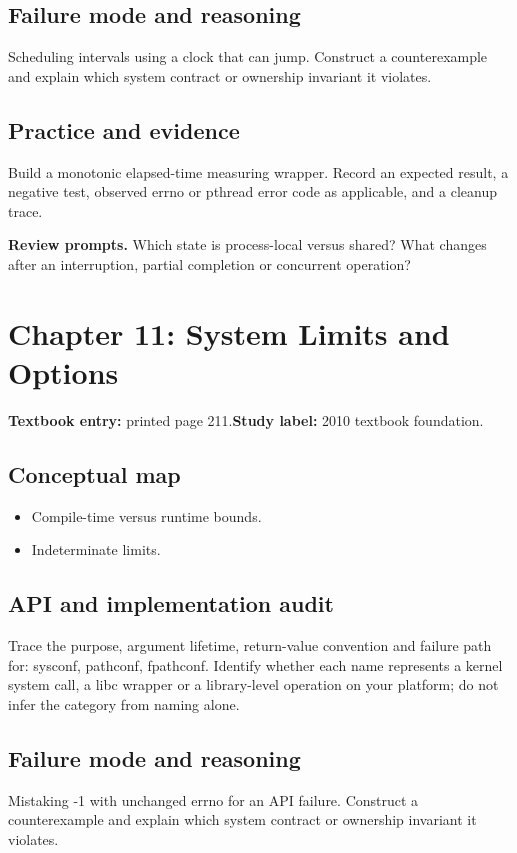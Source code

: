 \documentclass[11pt,letterpaper,oneside]{report}
\begin{document}
\subsection{Failure mode and reasoning}
Scheduling intervals using a clock that can jump. Construct a counterexample and explain which system contract or ownership invariant it violates.

\subsection{Practice and evidence}
Build a monotonic elapsed-time measuring wrapper. Record an expected result, a negative test, observed errno or pthread error code as applicable, and a cleanup trace.

\textbf{Review prompts.} Which state is process-local versus shared? What changes after an interruption, partial completion or concurrent operation?

\section{Chapter 11: System Limits and Options}
\textbf{Textbook entry:} printed page 211.\quad \textbf{Study label:} 2010 textbook foundation.

\subsection{Conceptual map}
\begin{itemize}
\item Compile-time versus runtime bounds.
\item Indeterminate limits.
\end{itemize}
\subsection{API and implementation audit}
Trace the purpose, argument lifetime, return-value convention and failure path for: sysconf, pathconf, fpathconf. Identify whether each name represents a kernel system call, a libc wrapper or a library-level operation on your platform; do not infer the category from naming alone.

\subsection{Failure mode and reasoning}
Mistaking -1 with unchanged errno for an API failure. Construct a counterexample and explain which system contract or ownership invariant it violates.
\end{document}

